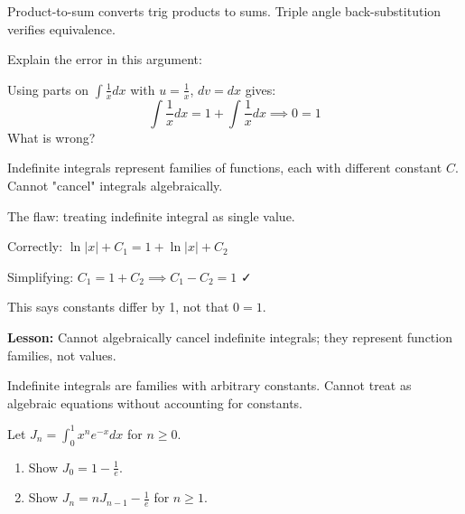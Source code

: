 \begin{takeaways}
Product-to-sum converts trig products to sums. Triple angle back-substitution verifies equivalence.
\end{takeaways}

\vspace{1cm}

\begin{problem}
Explain the error in this argument:

Using parts on $\int \frac{1}{x} dx$ with $u=\frac{1}{x}$, $dv=dx$ gives:
\[
\int \frac{1}{x} dx = 1 + \int \frac{1}{x} dx \implies 0 = 1
\]
What is wrong?
\end{problem}

\begin{hint}
Indefinite integrals represent families of functions, each with different constant $C$. Cannot "cancel" integrals algebraically.
\end{hint}

\begin{solution}
The flaw: treating indefinite integral as single value.

Correctly: $\ln|x| + C_1 = 1 + \ln|x| + C_2$

Simplifying: $C_1 = 1 + C_2 \implies C_1 - C_2 = 1$ ✓

This says constants differ by 1, not that $0=1$.

\textbf{Lesson:} Cannot algebraically cancel indefinite integrals; they represent function families, not values.
\end{solution}

\begin{takeaways}
Indefinite integrals are families with arbitrary constants. Cannot treat as algebraic equations without accounting for constants.
\end{takeaways}

\vspace{1cm}

\begin{problem}
Let $J_n = \int_0^1 x^n e^{-x} dx$ for $n \ge 0$.

\begin{enumerate}[label=(\roman*)]
\item Show $J_0 = 1 - \frac{1}{e}$.
\item Show $J_n = nJ_{n-1} - \frac{1}{e}$ for $n \ge 1$.
\end{enumerate}
\end{problem}

